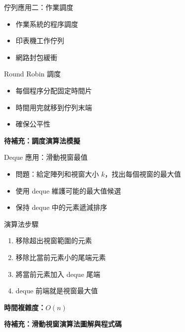 \documentclass{beamer}
\begin{document}
\begin{frame}{佇列應用二：作業調度}
\begin{itemize}
    \item 作業系統的程序調度
    \item 印表機工作佇列
    \item 網路封包緩衝
\end{itemize}

\vspace{1em}
\begin{block}{Round Robin 調度}
\begin{itemize}
    \item 每個程序分配固定時間片
    \item 時間用完就移到佇列末端
    \item 確保公平性
\end{itemize}
\end{block}

\vspace{1em}
\textbf{待補充：調度演算法模擬}
\end{frame}

\begin{frame}{Deque 應用：滑動視窗最值}
\begin{itemize}
    \item 問題：給定陣列和視窗大小 $k$，找出每個視窗的最大值
    \item 使用 deque 維護可能的最大值候選
    \item 保持 deque 中的元素遞減排序
\end{itemize}

\vspace{1em}
\begin{block}{演算法步驟}
\begin{enumerate}
    \item 移除超出視窗範圍的元素
    \item 移除比當前元素小的尾端元素
    \item 將當前元素加入 deque 尾端
    \item deque 前端就是視窗最大值
\end{enumerate}
\end{block}

\vspace{1em}
\textbf{時間複雜度：}$O(n)$

\vspace{1em}
\textbf{待補充：滑動視窗演算法圖解與程式碼}
\end{frame}
\end{document}
